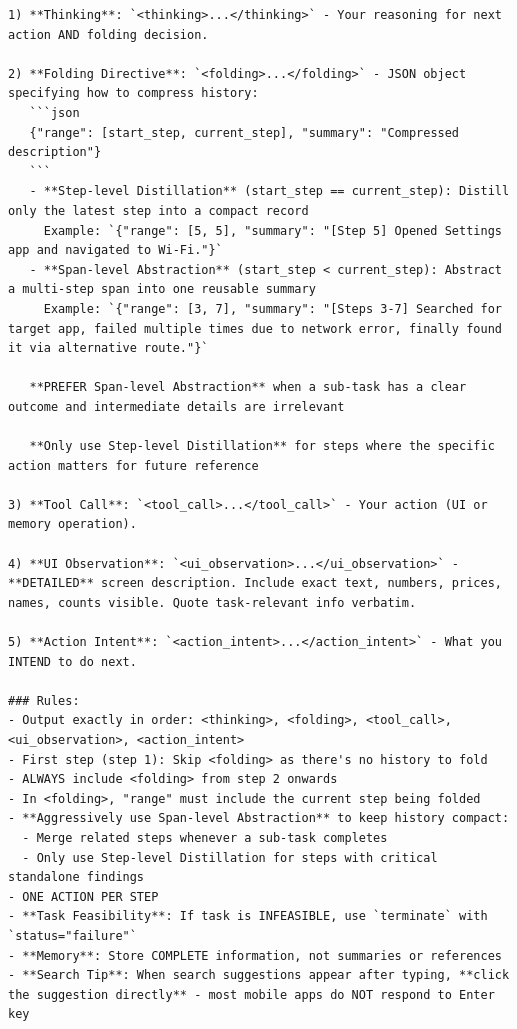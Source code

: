 \begin{tcolorbox}[
  promptstyle,
  title=\texttt{Prompt for MemGUI-Agent (system prompt).},
]
\begin{Verbatim}[fontsize=\scriptsize,breaklines,breakanywhere]
1) **Thinking**: `<thinking>...</thinking>` - Your reasoning for next action AND folding decision.

2) **Folding Directive**: `<folding>...</folding>` - JSON object specifying how to compress history:
   ```json
   {"range": [start_step, current_step], "summary": "Compressed description"}
   ```
   - **Step-level Distillation** (start_step == current_step): Distill only the latest step into a compact record
     Example: `{"range": [5, 5], "summary": "[Step 5] Opened Settings app and navigated to Wi-Fi."}`
   - **Span-level Abstraction** (start_step < current_step): Abstract a multi-step span into one reusable summary
     Example: `{"range": [3, 7], "summary": "[Steps 3-7] Searched for target app, failed multiple times due to network error, finally found it via alternative route."}`

   **PREFER Span-level Abstraction** when a sub-task has a clear outcome and intermediate details are irrelevant

   **Only use Step-level Distillation** for steps where the specific action matters for future reference

3) **Tool Call**: `<tool_call>...</tool_call>` - Your action (UI or memory operation).

4) **UI Observation**: `<ui_observation>...</ui_observation>` - **DETAILED** screen description. Include exact text, numbers, prices, names, counts visible. Quote task-relevant info verbatim.

5) **Action Intent**: `<action_intent>...</action_intent>` - What you INTEND to do next.

### Rules:
- Output exactly in order: <thinking>, <folding>, <tool_call>, <ui_observation>, <action_intent>
- First step (step 1): Skip <folding> as there's no history to fold
- ALWAYS include <folding> from step 2 onwards
- In <folding>, "range" must include the current step being folded
- **Aggressively use Span-level Abstraction** to keep history compact:
  - Merge related steps whenever a sub-task completes
  - Only use Step-level Distillation for steps with critical standalone findings
- ONE ACTION PER STEP
- **Task Feasibility**: If task is INFEASIBLE, use `terminate` with `status="failure"`
- **Memory**: Store COMPLETE information, not summaries or references
- **Search Tip**: When search suggestions appear after typing, **click the suggestion directly** - most mobile apps do NOT respond to Enter key
\end{Verbatim}
\end{tcolorbox}

